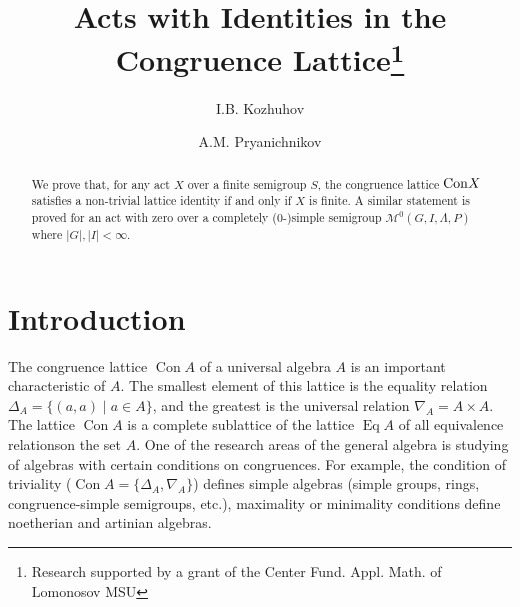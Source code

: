 \documentclass{birkau}
\numberwithin{equation}{section}
\theoremstyle{plain}
\theoremstyle{definition}
\DeclareMathOperator{\Con}{Con}
\DeclareMathOperator{\Eq}{Eq}
\begin{document}
	
    \title[Acts with Identities in the Congruence Lattice]{Acts with Identities in the Congruence Lattice\footnote{Research supported by a grant of the Center Fund. Appl. Math. of Lomonosov MSU}}

    \author[I.B. Kozhuhov]{I.B. Kozhuhov}
    \address{National Research University MIET, \\
    Faculty of Mechanics and Mathematics of Lomonosov Moscow State University, \\
    Center of Fundamental and Applied Mathematics of Lomonosov MSU \\
    Moscow\\Russia}

    \author[A.M. Pryanichnikov]{A.M. Pryanichnikov}
    \address{National Research University MIET\\Moscow\\Russia}
	

    \begin{abstract}
    We prove that, for any act $X$ over a finite semigroup $S$, the congruence lattice  ${\rm Con}X$ satisfies a non-trivial lattice identity if and only if $X$ is finite. A similar statement is proved for an act with zero over a completely (0-)simple semigroup $\mathcal M^0(G,I,\Lambda,P)$ where $|G|,|I| <\infty$.
    \end{abstract}
	
	\maketitle
	
	\section{Introduction}
	
	The congruence lattice $\Con A$ of a universal algebra $ A $ is an important characteristic of $A$. The smallest element of this lattice is the equality relation $ \Delta_A = \{ (a,a) \mid a \in A \} $, and the greatest is the universal relation $ \nabla_A = A \times A $. The lattice $\Con A$ is a complete sublattice of the lattice $\Eq A$ of all equivalence relationson the set $A$.
One of the research areas of the general algebra is studying of algebras with certain conditions on congruences.	For example, the condition of triviality ($ \Con A = \{ \Delta_A, \nabla_A \} $) defines simple algebras (simple groups, rings, congruence-simple semigroups, etc.), maximality or minimality conditions define noetherian and artinian algebras.
	
\end{document}
